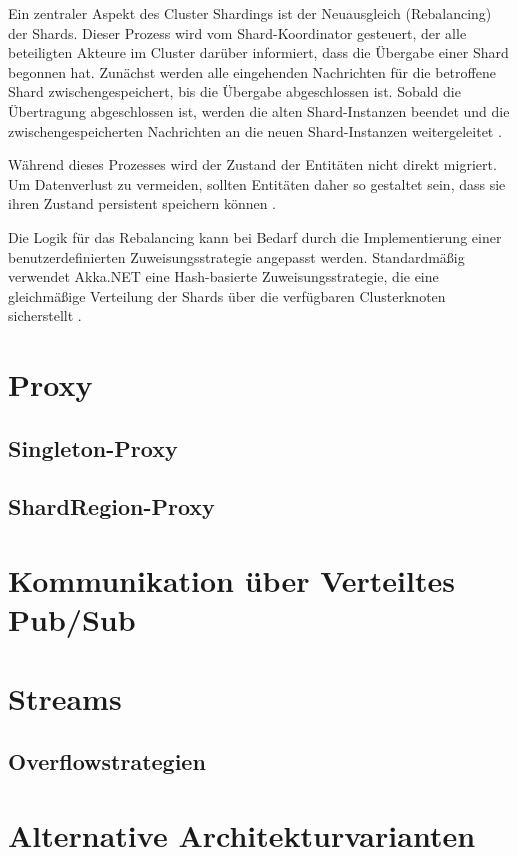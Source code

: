 Ein zentraler Aspekt des Cluster Shardings ist der Neuausgleich (Rebalancing) der Shards.  
Dieser Prozess wird vom Shard-Koordinator gesteuert, der alle beteiligten Akteure im Cluster darüber informiert, dass die Übergabe einer Shard begonnen hat.  
Zunächst werden alle eingehenden Nachrichten für die betroffene Shard zwischengespeichert, bis die Übergabe abgeschlossen ist.  
Sobald die Übertragung abgeschlossen ist, werden die alten Shard-Instanzen beendet und die zwischengespeicherten Nachrichten an die neuen Shard-Instanzen weitergeleitet \parencite{cluster_sharding_petabridge}.  

Während dieses Prozesses wird der Zustand der Entitäten nicht direkt migriert.  
Um Datenverlust zu vermeiden, sollten Entitäten daher so gestaltet sein, dass sie ihren Zustand persistent speichern können \parencite{cluster_sharding_petabridge}.  

Die Logik für das Rebalancing kann bei Bedarf durch die Implementierung einer benutzerdefinierten Zuweisungsstrategie angepasst werden.  
Standardmäßig verwendet Akka.NET eine Hash-basierte Zuweisungsstrategie, die eine gleichmäßige Verteilung der Shards über die verfügbaren Clusterknoten sicherstellt \parencite{getakka_cluster_sharding}.

\section{Proxy}

\subsection{Singleton-Proxy}
\subsection{ShardRegion-Proxy}

\section{Kommunikation über Verteiltes Pub/Sub}

\section{Streams}

\subsection{Overflowstrategien}


\section{Alternative Architekturvarianten}
